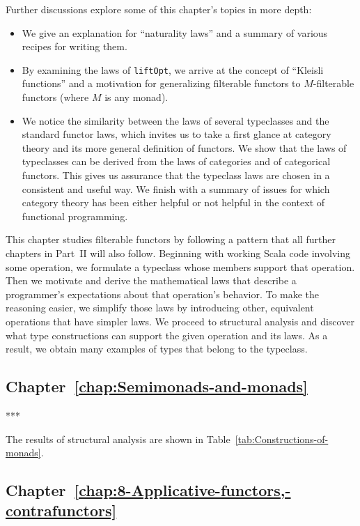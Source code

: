 Further discussions explore some of this chapter\textsf{'}s topics in more
depth:
\begin{itemize}
\item We give an explanation for \textsf{``}naturality laws\textsf{''} and a summary of
various recipes for writing them.
\item By examining the laws of \lstinline!liftOpt!, we arrive at the concept
of \textsf{``}Kleisli functions\textsf{''} and a motivation for generalizing filterable
functors to $M$-filterable functors (where $M$ is any monad). 
\item We notice the similarity between the laws of several typeclasses and
the standard functor laws, which invites us to take a first glance
at category theory and its more general definition of functors. We
show that the laws of typeclasses can be derived from the laws of
categories and of categorical functors. This gives us assurance that
the typeclass laws are chosen in a consistent and useful way. We finish
with a summary of issues for which category theory has been either
helpful or not helpful in the context of functional programming.
\end{itemize}
This chapter studies filterable functors by following a pattern that
all further chapters in Part~II will also follow. Beginning with
working Scala code involving some operation, we formulate a typeclass
whose members support that operation. Then we motivate and derive
the mathematical laws that describe a programmer\textsf{'}s expectations about
that operation\textsf{'}s behavior. To make the reasoning easier, we simplify
those laws by introducing other, equivalent operations that have simpler
laws. We proceed to structural analysis and discover what type constructions
can support the given operation and its laws. As a result, we obtain
many examples of types that belong to the typeclass.

\subsection{Chapter~\ref{chap:Semimonads-and-monads}}

{*}{*}{*}

The results of structural analysis are shown in Table~\ref{tab:Constructions-of-monads}.

\subsection{Chapter~\ref{chap:8-Applicative-functors,-contrafunctors}}

